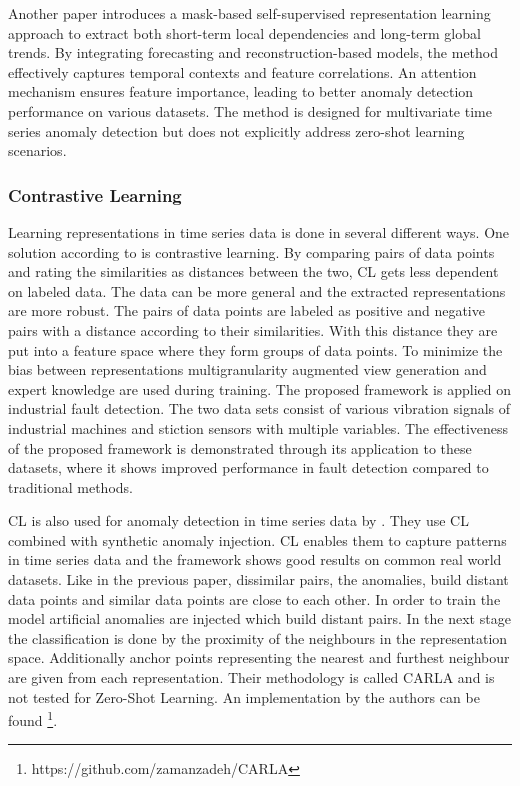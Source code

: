 Another paper introduces a mask-based self-supervised representation learning approach to extract both short-term local dependencies and long-term global trends. By integrating forecasting and reconstruction-based models, the method effectively captures temporal contexts and feature correlations. An attention mechanism ensures feature importance, leading to better anomaly detection performance on various datasets. The method is designed for multivariate time series anomaly detection but does not explicitly address zero-shot learning scenarios.
\cite{miao_unsupervised_2022}

\subsubsection{Contrastive Learning}
Learning representations in time series data is done in several different ways. One solution according to \cite{zhang_debiased_2024} is contrastive learning. By comparing pairs of data points and rating the similarities as distances between the two, CL gets less dependent on labeled data. The data can be more general and the extracted representations are more robust. The pairs of data points are labeled as positive and negative pairs with a distance according to their similarities. With this distance they are put into a feature space where they form groups of data points. To minimize the bias between representations multigranularity augmented view generation and expert knowledge are used during training. The proposed framework is applied on industrial fault detection. The two data sets consist of various vibration signals of industrial machines and stiction sensors with multiple variables. The effectiveness of the proposed framework is demonstrated through its application to these datasets, where it shows improved performance in fault detection compared to traditional methods.

CL is also used for anomaly detection in time series data by \cite{darban_carla_2024}. They use CL combined with synthetic anomaly injection. CL enables them to capture patterns in time series data and the framework shows good results on common real world datasets. Like in the previous paper, dissimilar pairs, the anomalies, build distant data points and similar data points are close to each other. In order to train the model artificial anomalies are injected which build distant pairs. In the next stage the classification is done by  the proximity of the neighbours in the representation space. Additionally anchor points representing the nearest and furthest neighbour are given from each representation. Their methodology is called CARLA and is not tested for Zero-Shot Learning. An implementation by the authors can be found \footnote{\fussy\tiny https://github.com/zamanzadeh/CARLA}.

